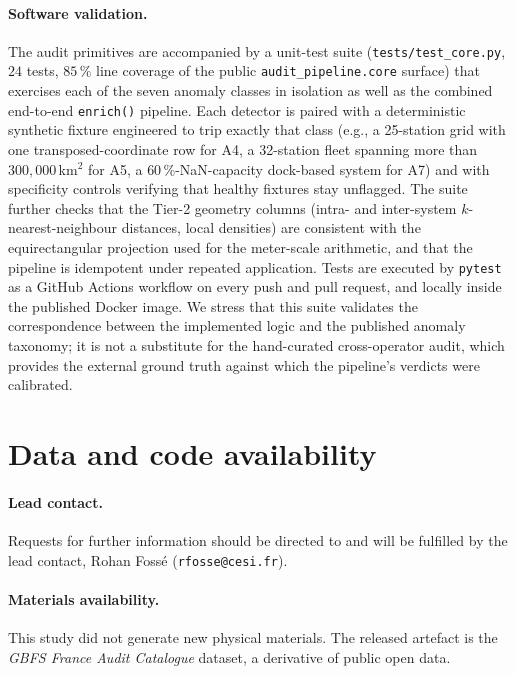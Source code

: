 \documentclass[11pt,a4paper]{article}
\begin{document}
\paragraph{Software validation.}
The audit primitives are accompanied by a unit-test suite
(\texttt{tests/test\_core.py}, $24$ tests, $85\,\%$ line coverage of
the public \texttt{audit\_pipeline.core} surface) that exercises each
of the seven anomaly classes in isolation as well as the combined
end-to-end \texttt{enrich()} pipeline. Each detector is paired with
a deterministic synthetic fixture engineered to trip exactly that
class (e.g., a 25-station grid with one transposed-coordinate row
for A4, a 32-station fleet spanning more than $300{,}000$\,km$^2$
for A5, a $60\,\%$-NaN-capacity dock-based system for A7) and with
specificity controls verifying that healthy fixtures stay
unflagged. The suite further checks that the Tier-2 geometry
columns (intra- and inter-system $k$-nearest-neighbour distances,
local densities) are consistent with the equirectangular projection
used for the meter-scale arithmetic, and that the pipeline is
idempotent under repeated application. Tests are executed by
\texttt{pytest} as a GitHub Actions workflow on every push and pull
request, and locally inside the published Docker image. We stress
that this suite validates the correspondence between the
implemented logic and the published anomaly taxonomy; it is not a
substitute for the hand-curated cross-operator audit, which
provides the external ground truth against which the pipeline's
verdicts were calibrated.

\section{Data and code availability}

\paragraph{Lead contact.} Requests for further information should be
directed to and will be fulfilled by the lead contact, Rohan Foss\'e
(\texttt{rfosse@cesi.fr}).

\paragraph{Materials availability.} This study did not generate new
physical materials. The released artefact is the
\emph{GBFS France Audit Catalogue} dataset, a derivative of public open
data.
\end{document}
